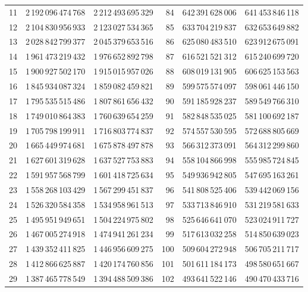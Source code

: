 \begin{longtable}{@{}r r r@{\qquad}r r r@{}}
11 & 2\,192\,096\,474\,768 & 2\,212\,493\,695\,329 & 84 & 642\,391\,628\,006 & 641\,453\,846\,118\\
12 & 2\,104\,830\,956\,933 & 2\,123\,027\,534\,365 & 85 & 633\,704\,219\,837 & 632\,653\,649\,882\\
13 & 2\,028\,842\,799\,377 & 2\,045\,379\,653\,516 & 86 & 625\,080\,483\,510 & 623\,912\,675\,091\\
14 & 1\,961\,473\,219\,432 & 1\,976\,652\,892\,798 & 87 & 616\,521\,521\,312 & 615\,240\,699\,720\\
15 & 1\,900\,927\,502\,170 & 1\,915\,015\,957\,026 & 88 & 608\,019\,131\,905 & 606\,625\,153\,563\\
16 & 1\,845\,934\,087\,324 & 1\,859\,082\,459\,821 & 89 & 599\,575\,574\,097 & 598\,061\,446\,150\\
17 & 1\,795\,535\,515\,486 & 1\,807\,861\,656\,432 & 90 & 591\,185\,928\,237 & 589\,549\,766\,310\\
18 & 1\,749\,010\,864\,383 & 1\,760\,639\,654\,259 & 91 & 582\,848\,535\,025 & 581\,100\,692\,187\\
19 & 1\,705\,798\,199\,911 & 1\,716\,803\,774\,837 & 92 & 574\,557\,530\,595 & 572\,688\,805\,669\\
20 & 1\,665\,449\,974\,681 & 1\,675\,878\,497\,878 & 93 & 566\,312\,373\,091 & 564\,312\,299\,860\\
21 & 1\,627\,601\,319\,628 & 1\,637\,527\,753\,883 & 94 & 558\,104\,866\,998 & 555\,985\,724\,845\\
22 & 1\,591\,957\,568\,799 & 1\,601\,418\,725\,634 & 95 & 549\,936\,942\,805 & 547\,695\,163\,261\\
23 & 1\,558\,268\,103\,429 & 1\,567\,299\,451\,837 & 96 & 541\,808\,525\,406 & 539\,442\,069\,156\\
24 & 1\,526\,320\,584\,358 & 1\,534\,958\,961\,513 & 97 & 533\,713\,846\,910 & 531\,219\,581\,633\\
25 & 1\,495\,951\,949\,651 & 1\,504\,224\,975\,802 & 98 & 525\,646\,641\,070 & 523\,024\,911\,727\\
26 & 1\,467\,005\,274\,918 & 1\,474\,941\,261\,234 & 99 & 517\,613\,032\,258 & 514\,850\,639\,023\\
27 & 1\,439\,352\,411\,825 & 1\,446\,956\,609\,275 & 100 & 509\,604\,272\,948 & 506\,705\,211\,717\\
28 & 1\,412\,866\,625\,887 & 1\,420\,174\,760\,856 & 101 & 501\,611\,184\,173 & 498\,580\,651\,667\\
29 & 1\,387\,465\,778\,549 & 1\,394\,488\,509\,386 & 102 & 493\,641\,522\,146 & 490\,470\,433\,716\\

\end{longtable}
